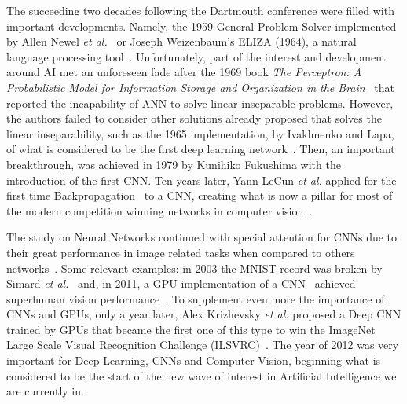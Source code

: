 \documentclass[class=report, crop=false, a4paper, 12pt]{standalone}
\begin{document}
\par The succeeding two decades following the Dartmouth conference were filled with important developments. Namely, the 1959 General Problem Solver implemented by Allen Newel \textit{et al.}~\autocite{newell1959report} or Joseph Weizenbaum's ELIZA (1964), a natural language processing tool~\autocite{weizenbaumELIZAComputerProgram1966}. Unfortunately, part of the interest and development around AI met an unforeseen fade after the 1969 book \textit{The Perceptron: A Probabilistic Model for Information Storage and Organization in the Brain}~\autocite{minsky69perceptrons} that reported the incapability of ANN to solve linear inseparable problems. However, the authors failed to consider other solutions already proposed that solves the linear inseparability, such as the 1965 implementation, by Ivakhnenko and Lapa, of what is considered to be the first deep learning network~\autocite{ivakhnenkoCyberneticPredictingDevices}. Then, an important breakthrough, was achieved in 1979 by Kunihiko Fukushima with the introduction of the first \gls{CNN}. Ten years later, Yann LeCun \textit{et al.} applied for the first time Backpropagation~\autocite{6795724} to a CNN, creating what is now a pillar for most of the modern competition winning networks in computer vision~\autocite{schmidhuberDeepLearningNeural2015}. 
\par The study on Neural Networks continued with special attention for CNNs due to their great performance in image related tasks when compared to others networks~\autocite{lecunGradientBasedLearningApplied1998}. Some relevant examples: in 2003 the MNIST record was broken by Simard \textit{et al.}~\autocite{simardBestPracticesConvolutional2003} and, in 2011, a GPU implementation of a CNN~\autocite{ciresanCommitteeNeuralNetworks2011} achieved superhuman vision performance~\autocite{stallkampManVsComputer2012}. To supplement even more the importance of CNNs and GPUs, only a year later, Alex Krizhevsky \textit{et al.} proposed a Deep CNN trained by GPUs that became the first one of this type to win the ImageNet Large Scale Visual Recognition Challenge (ILSVRC)~\autocite{krizhevskyImageNetClassificationDeep2012}. The year of 2012 was very important for Deep Learning, CNNs and Computer Vision, beginning what is considered to be the start of the new wave of interest in Artificial Intelligence we are currently in. 
\end{document}
